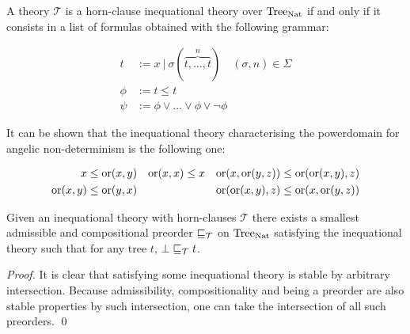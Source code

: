 \begin{adefinition}
    A theory $\mathcal{T}$ is a horn-clause inequational 
    theory over $\textnormal{Tree}_{\textnormal{Nat}}$ if and only if it consists 
    in a list of formulas obtained with the following grammar:

    \begin{align*}
        t    &:= x ~|~ \sigma (\overbrace{t,\dots,t}^n) \quad (\sigma,n) \in
        \Sigma\\
        \phi &:= t \leq t \\
        \psi &:= \phi \vee \dots \vee \phi \vee \neg \phi
    \end{align*}
\end{adefinition}

\begin{example}
    It can be shown that the inequational theory 
    characterising the powerdomain for angelic 
    non-determinism is the following one:

    \begin{align*}
        x \leq \operatorname{or} (x,y) & & \operatorname{or} (x,x) \leq x & & \operatorname{or} (x,\operatorname{or} (y,z))
        \leq \operatorname{or}(\operatorname{or} (x,y),z) \\
        \operatorname{or} (x,y) \leq \operatorname{or}(y,x) & & & & \operatorname{or}(\operatorname{or} (x,y),z) \leq \operatorname{or}
        (x,\operatorname{or} (y,z))
    \end{align*}
\end{example}

\begin{alemma}
    \label{lem:freepreo}
    Given an inequational theory with horn-clauses $\mathcal{T}$
    there exists a smallest admissible 
    and compositional preorder $\sqsubseteq_\mathcal{T}$ 
    on $\textnormal{Tree}_{\textnormal{Nat}}$ satisfying the inequational theory 
    such that for any tree $t$, $\bot \sqsubseteq_\mathcal{T} t$.
\end{alemma}

\begin{proof}
    It is clear that satisfying some inequational 
    theory is stable by arbitrary intersection. Because 
    admissibility, compositionality and being 
    a preorder are also 
    stable properties by such intersection, one 
    can take the intersection of all such preorders.
\qed\end{proof}
